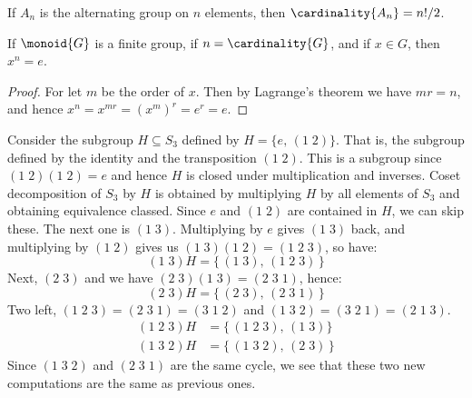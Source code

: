 \documentclass{book}                                                           %
\begin{document}
            \begin{theorem}
                If $A_{n}$ is the alternating group on $n$ elements, then
                $\cardinality{A_{n}}=n!/2$.
            \end{theorem}
            \begin{theorem}
                If $\monoid{G}$ is a finite group, if $n=\cardinality{G}$,
                and if $x\in{G}$, then $x^{n}=e$.
            \end{theorem}
            \begin{proof}
                For let $m$ be the order of $x$. Then by Lagrange's theorem
                we have $mr=n$, and hence
                $x^{n}=x^{mr}=(x^{m})^{r}=e^{r}=e$.
            \end{proof}
            \begin{example}
                Consider the subgroup $H\subseteq{S}_{3}$ defined by
                $H=\{e,\,(1\;2)\}$. That is, the subgroup defined by the
                identity and the transposition $(1\;2)$. This is a subgroup
                since $(1\;2)(1\;2)=e$ and hence $H$ is closed under
                multiplication and inverses. Coset decomposition of $S_{3}$
                by $H$ is obtained by multiplying $H$ by all elements of
                $S_{3}$ and obtaining equivalence classed. Since
                $e$ and $(1\;2)$ are contained in $H$, we can skip these.
                The next one is $(1\;3)$. Multiplying by $e$ gives $(1\;3)$
                back, and multiplying by $(1\;2)$ gives us
                $(1\;3)(1\;2)=(1\;2\;3)$, so have:
                \begin{equation}
                    (1\;3)H=\{\,(1\;3),\,(1\;2\;3)\,\}
                \end{equation}
                Next, $(2\;3)$ and we have $(2\;3)(1\;3)=(2\;3\;1)$, hence:
                \begin{equation}
                    (2\;3)H=\{\,(2\;3),\,(2\;3\;1)\,\}
                \end{equation}
                Two left, $(1\;2\;3)=(2\;3\;1)=(3\;1\;2)$ and
                $(1\;3\;2)=(3\;2\;1)=(2\;1\;3)$.
                \begin{subequations}
                    \begin{align}
                        (1\;2\;3)H&=\{\,(1\;2\;3),\,(1\;3)\}\\
                        (1\;3\;2)H&=\{\,(1\;3\;2),\,(2\;3)\,\}
                    \end{align}
                \end{subequations}
                Since $(1\;3\;2)$ and $(2\;3\;1)$ are the same cycle, we see
                that these two new computations are the same as previous
                ones.
            \end{example}
\end{document}
